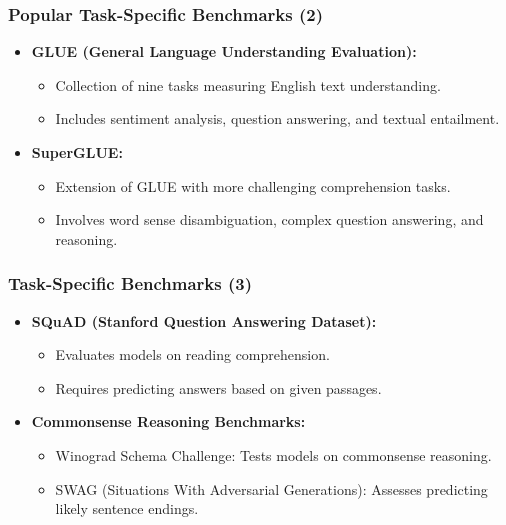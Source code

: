 \begin{frame}[fragile]\frametitle{Popular Task-Specific Benchmarks (2)}
  \begin{itemize}
    \item \textbf{GLUE (General Language Understanding Evaluation):}
      \begin{itemize}
        \item Collection of nine tasks measuring English text understanding.
        \item Includes sentiment analysis, question answering, and textual entailment.
      \end{itemize}
    \item \textbf{SuperGLUE:}
      \begin{itemize}
        \item Extension of GLUE with more challenging comprehension tasks.
        \item Involves word sense disambiguation, complex question answering, and reasoning.
      \end{itemize}
  \end{itemize}
\end{frame}

\begin{frame}[fragile]\frametitle{Task-Specific Benchmarks (3)}
  \begin{itemize}
    \item \textbf{SQuAD (Stanford Question Answering Dataset):}
      \begin{itemize}
        \item Evaluates models on reading comprehension.
        \item Requires predicting answers based on given passages.
      \end{itemize}
    \item \textbf{Commonsense Reasoning Benchmarks:}
      \begin{itemize}
        \item Winograd Schema Challenge: Tests models on commonsense reasoning.
        \item SWAG (Situations With Adversarial Generations): Assesses predicting likely sentence endings.
      \end{itemize}
  \end{itemize}
\end{frame}

